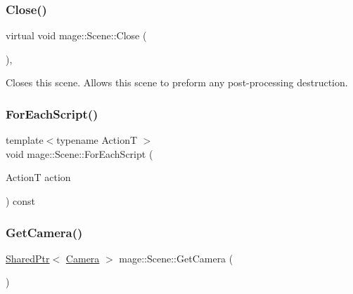 \hypertarget{classmage_1_1_scene_a16786d7fcf0b813e2e94061b082cfd1d}{}\label{classmage_1_1_scene_a16786d7fcf0b813e2e94061b082cfd1d} 
\subsubsection{\texorpdfstring{Close()}{Close()}}
{\footnotesize\ttfamily virtual void mage\+::\+Scene\+::\+Close (\begin{DoxyParamCaption}{ }\end{DoxyParamCaption})\hspace{0.3cm}{\ttfamily [protected]}, {\ttfamily [virtual]}}

Closes this scene. Allows this scene to preform any post-\/processing destruction. \hypertarget{classmage_1_1_scene_a4d16d973adce12868b9a0df9d92ef6d6}{}\label{classmage_1_1_scene_a4d16d973adce12868b9a0df9d92ef6d6} 
\subsubsection{\texorpdfstring{For\+Each\+Script()}{ForEachScript()}}
{\footnotesize\ttfamily template$<$typename ActionT $>$ \\
void mage\+::\+Scene\+::\+For\+Each\+Script (\begin{DoxyParamCaption}\item[{ActionT}]{action }\end{DoxyParamCaption}) const}

\hypertarget{classmage_1_1_scene_a8845b10d7c51aa8ba824b694556ca84d}{}\label{classmage_1_1_scene_a8845b10d7c51aa8ba824b694556ca84d} 
\subsubsection{\texorpdfstring{Get\+Camera()}{GetCamera()}}
{\footnotesize\ttfamily \hyperlink{namespacemage_a1e01ae66713838a7a67d30e44c67703e}{Shared\+Ptr}$<$ \hyperlink{classmage_1_1_camera}{Camera} $>$ mage\+::\+Scene\+::\+Get\+Camera (\begin{DoxyParamCaption}{ }\end{DoxyParamCaption})}

